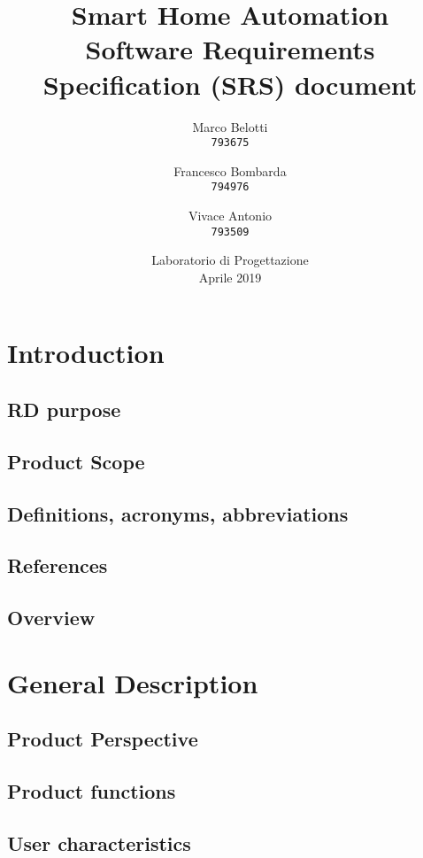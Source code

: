 \documentclass[12pt,a4paper]{report}
\begin{document}
\title{%
  \Huge Smart Home Automation\\
  \large Software Requirements Specification (SRS) document\\
    }
\author{
  Marco Belotti\\
  \texttt{793675}
  \and
  Francesco Bombarda\\
  \texttt{794976}
   \and
  Vivace Antonio\\
  \texttt{793509}
}
\date{Laboratorio di Progettazione \\ Aprile 2019}
\maketitle

\tableofcontents



\chapter{Introduction}
\section{RD purpose}
\section{Product Scope}
\section{Definitions, acronyms, abbreviations}
\section{References}
\section{Overview}
\chapter{General Description}
\section{Product Perspective}
\section{Product functions}
\section{User characteristics}
\end{document}
